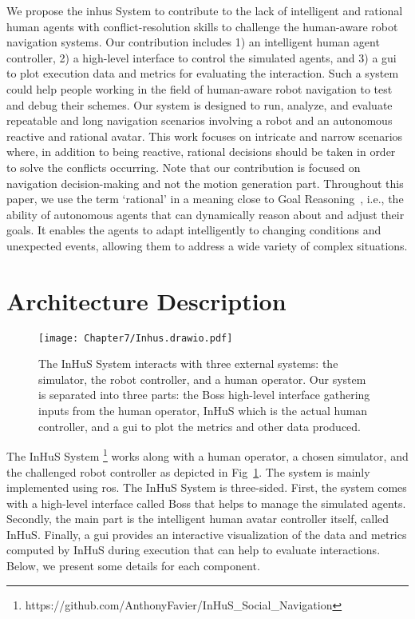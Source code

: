 We propose the \acrfull{inhus} System to contribute to the lack of intelligent and rational human agents with conflict-resolution skills to challenge the human-aware robot navigation systems. Our contribution includes 1) an intelligent human agent controller, 2) a high-level interface to control the simulated agents, and 3) a \acrfull{gui} to plot execution data and metrics for evaluating the interaction. Such a system could help people working in the field of human-aware robot navigation to test and debug their schemes. Our system is designed to run, analyze, and evaluate repeatable and long navigation scenarios involving a robot and an autonomous reactive and rational avatar. This work focuses on intricate and narrow scenarios where, in addition to being reactive, rational decisions should be taken in order to solve the conflicts occurring. Note that our contribution is focused on navigation decision-making and not the motion generation part. Throughout this paper, we use the term `rational' in a meaning close to Goal Reasoning~\cite{vattam_breadth_nodate,abbass_goal_2018}, i.e., the ability of autonomous agents that can dynamically reason about and adjust their goals. It enables the agents to adapt intelligently to changing conditions and unexpected events, allowing them to address a wide variety of complex situations.


\section{Architecture Description}
 
\begin{figure}
    \centering
    \texttt{[image: Chapter7/Inhus.drawio.pdf]}
    \caption{
    The InHuS System interacts with three external systems: the simulator, the robot controller, and a human operator. Our system is separated into three parts: the Boss high-level interface gathering inputs from the human operator, InHuS which is the actual human controller, and a \acrshort{gui} to plot the metrics and other data produced.
    }
    \label{fig:overview_inhus}
\end{figure}

The InHuS System%
\footnote{https://github.com/AnthonyFavier/InHuS\_Social\_Navigation}
works along with a human operator, a chosen simulator, and the challenged robot controller as depicted in Fig~\ref{fig:overview_inhus}. The system is mainly implemented using \acrshort{ros}. The InHuS  System is three-sided. First, the system comes with a high-level interface called Boss that helps to manage the simulated agents. Secondly, the main part is the intelligent human avatar controller itself, called InHuS.
Finally, a \acrshort{gui} provides an interactive visualization of the data and metrics computed by InHuS during execution that can help to evaluate interactions. Below, we present some details for each component.


